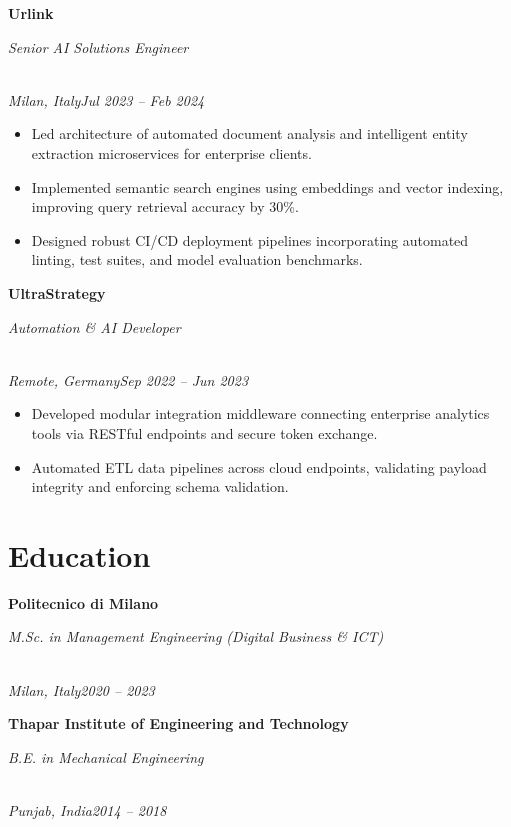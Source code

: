 \documentclass[a4paper,10pt]{article}
\newcommand{\role}[4]{\vspace{3pt}\noindent\hspace{0.6em}\parbox[t]{0.38\textwidth}{\raggedright\textbf{#1}}\hfill\parbox[t]{0.58\textwidth}{\raggedleft\textit{#2}}\\{\textit{#3}\hfill\textit{#4}}\vspace{1pt}}
\begin{document}
\role{Urlink}{Senior AI Solutions Engineer}{Milan, Italy}{Jul 2023 -- Feb 2024}
\begin{itemize}
\item Led architecture of automated document analysis and intelligent entity extraction microservices for enterprise clients.
\item Implemented semantic search engines using embeddings and vector indexing, improving query retrieval accuracy by 30\%.
\item Designed robust CI/CD deployment pipelines incorporating automated linting, test suites, and model evaluation benchmarks.
\end{itemize}

\role{UltraStrategy}{Automation \& AI Developer}{Remote, Germany}{Sep 2022 -- Jun 2023}
\begin{itemize}
\item Developed modular integration middleware connecting enterprise analytics tools via RESTful endpoints and secure token exchange.
\item Automated ETL data pipelines across cloud endpoints, validating payload integrity and enforcing schema validation.
\end{itemize}

\section{Education}
\role{Politecnico di Milano}{M.Sc. in Management Engineering (Digital Business \& ICT)}{Milan, Italy}{2020 -- 2023}
\role{Thapar Institute of Engineering and Technology}{B.E. in Mechanical Engineering}{Punjab, India}{2014 -- 2018}
\end{document}

